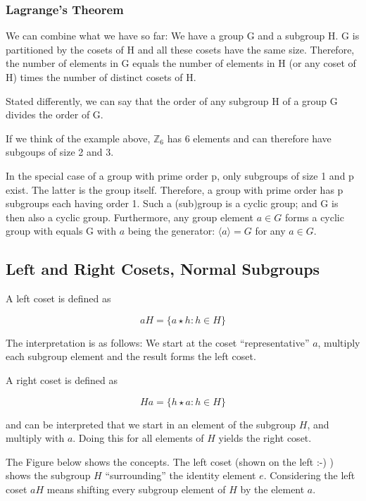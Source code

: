 \subsubsection{Lagrange's Theorem}\label{lagranges-theorem}

We can combine what we have so far: We have a group G and a subgroup H.
G is partitioned by the cosets of H and all these cosets have the same
size. Therefore, the number of elements in G equals the number of
elements in H (or any coset of H) times the number of distinct cosets of
H.

Stated differently, we can say that the order of any subgroup H of a
group G divides the order of G.

If we think of the example above, \(\mathbb{Z}_6\) has 6 elements and
can therefore have subgoups of size 2 and 3.

In the special case of a group with prime order p, only subgroups of
size 1 and p exist. The latter is the group itself. Therefore, a group
with prime order has p subgroups each having order 1. Such a (sub)group
is a cyclic group; and G is then also a cyclic group. Furthermore, any
group element \(a \in G\) forms a cyclic group with equals G with \(a\)
being the generator: \(\langle a \rangle = G\) for any \(a \in G\).

\subsection{Left and Right Cosets, Normal
Subgroups}\label{left-and-right-cosets-normal-subgroups}

A left coset is defined as

\[
aH = \{a \star h: h \in H \}
\]

The interpretation is as follows: We start at the coset
``representative'' \(a\), multiply each subgroup element and the result
forms the left coset.

A right coset is defined as

\[
Ha = \{h \star a : h \in H \}
\]

and can be interpreted that we start in an element of the subgroup
\(H\), and multiply with \(a\). Doing this for all elements of \(H\)
yields the right coset.

The Figure below shows the concepts. The left coset (shown on the left
:-) ) shows the subgroup \(H\) ``surrounding'' the identity element
\(e\). Considering the left coset \(aH\) means shifting every subgroup
element of \(H\) by the element \(a\).

